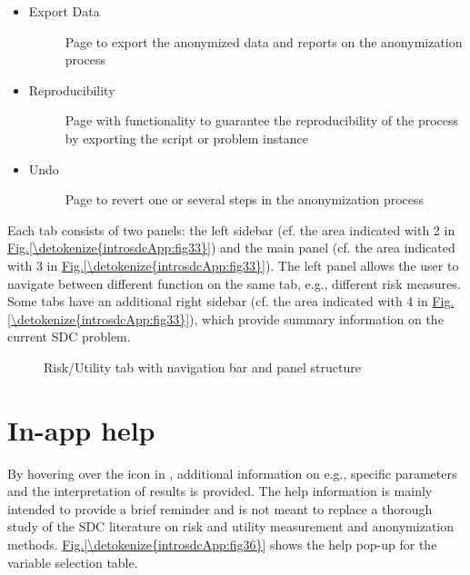 \documentclass[letterpaper,10pt,english]{sphinxmanual}
\begin{document}
\begin{itemize}
\item {} \begin{description}
\item[{Export Data}] \leavevmode
Page to export the anonymized data and reports on the anonymization process

\end{description}

\item {} \begin{description}
\item[{Reproducibility}] \leavevmode
Page with functionality to guarantee the reproducibility of the process by exporting the
 script or problem instance

\end{description}

\item {} \begin{description}
\item[{Undo}] \leavevmode
Page to revert one or several steps in the anonymization process

\end{description}

\end{itemize}

Each tab consists of two panels: the left sidebar (cf. the area indicated with 2 in \hyperref[\detokenize{introsdcApp:fig33}]{Fig.\@ \ref{\detokenize{introsdcApp:fig33}}})
and the main panel (cf. the area indicated with 3 in \hyperref[\detokenize{introsdcApp:fig33}]{Fig.\@ \ref{\detokenize{introsdcApp:fig33}}}). The left panel
allows the user to navigate between different function on the same tab, e.g., different
risk measures. Some tabs have an additional right sidebar (cf. the area indicated with 4 in \hyperref[\detokenize{introsdcApp:fig33}]{Fig.\@ \ref{\detokenize{introsdcApp:fig33}}}),
which provide summary information on the current SDC problem.

\begin{figure}[htbp]
\centering
\capstart

\noindent{}
\caption{Risk/Utility tab with navigation bar and panel structure}\label{\detokenize{introsdcApp:fig33}}\label{\detokenize{introsdcApp:id3}}\end{figure}


\section{In-app help}
\label{\detokenize{introsdcApp:in-app-help}}
By hovering over the  icon in , additional information on e.g.,
specific parameters and the interpretation of results is provided. The help information
is mainly intended to provide a brief reminder and is not meant to replace a thorough
study of the SDC literature on risk and utility measurement and anonymization methods.
\hyperref[\detokenize{introsdcApp:fig36}]{Fig.\@ \ref{\detokenize{introsdcApp:fig36}}} shows the help pop-up for the variable selection table.
\end{document}
